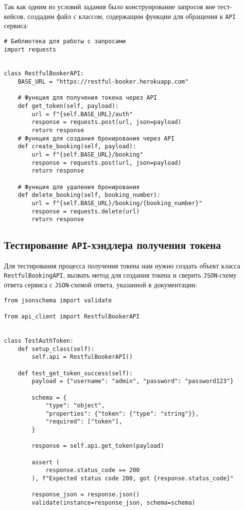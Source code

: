 \documentclass[a4paper]{article}
\begin{document}
    Так как одним из условий задания было конструирование запросов вне тест-кейсов,
    создадим файл с классом, содержащим функции для обращения к \texttt{API} сервиса:

    \begin{verbatim}
# Библиотека для работы с запросами
import requests


class RestfulBookerAPI:
    BASE_URL = "https://restful-booker.herokuapp.com"

    # Функция для получения токена через API
    def get_token(self, payload):
        url = f"{self.BASE_URL}/auth"
        response = requests.post(url, json=payload)
        return response
    # Функция для создания бронирования через API
    def create_booking(self, payload):
        url = f"{self.BASE_URL}/booking"
        response = requests.post(url, json=payload)
        return response

    # Функция для удаления бронирования
    def delete_booking(self, booking_number):
        url = f"{self.BASE_URL}/booking/{booking_number}"
        response = requests.delete(url)
        return response
    \end{verbatim}

    \subsection{Тестирование \texttt{API}-хэндлера получения токена}

    Для тестирования процесса получения токена нам нужно создать объект класса
    \texttt{RestfulBookingAPI}, вызвать метод для создания токена и сверить
    \texttt{JSON}-схему ответа сервиса с \texttt{JSON}-схемой ответа, указанной в документации:

    \begin{verbatim}
from jsonschema import validate

from api_client import RestfulBookerAPI


class TestAuthToken:
    def setup_class(self):
        self.api = RestfulBookerAPI()

    def test_get_token_success(self):
        payload = {"username": "admin", "password": "password123"}

        schema = {
            "type": "object",
            "properties": {"token": {"type": "string"}},
            "required": ["token"],
        }

        response = self.api.get_token(payload)

        assert (
            response.status_code == 200
        ), f"Expected status code 200, got {response.status_code}"

        response_json = response.json()
        validate(instance=response_json, schema=schema)
    \end{verbatim}
\end{document}
